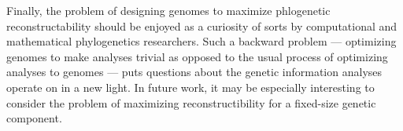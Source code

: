 Finally, the problem of designing genomes to maximize phlogenetic reconstructability should be enjoyed as a curiosity of sorts by computational and mathematical phylogenetics researchers.
Such a backward problem --- optimizing genomes to make analyses trivial as opposed to the usual process of optimizing analyses to genomes --- puts questions about the genetic information analyses operate on in a new light.
In future work, it may be especially interesting to consider the problem of maximizing reconstructibility for a fixed-size genetic component.
